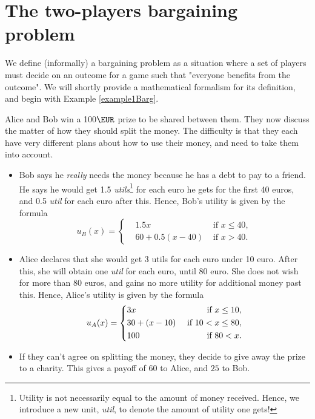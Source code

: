 \section{The two-players bargaining problem}
\label{sec2PBarg}


We define (informally) a bargaining problem as a situation where a set of players must decide on an outcome for a game such that "everyone benefits from the outcome". We will shortly provide a mathematical formalism for its definition, and begin with Example \ref{example1Barg}.

\begin{example}
\label{example1Barg}
Alice and Bob win a 100$\EUR$ prize to be shared between them.
They now discuss the matter of how they should split the money. The difficulty is that they each have very different plans about how to use their money, and need to take them into account.
\begin{itemize}
\item Bob says he \emph{really} needs the money because he has a debt to pay to a friend.
He says he would get 1.5 \emph{utils}\footnote{Utility is not necessarily equal to the amount of money received. Hence, we introduce a new unit, \emph{util}, to denote the amount of utility one gets!} for each euro he gets for the first 40 euros, and 0.5 \emph{util} for each euro after this.
Hence, Bob's utility is given by the formula
$$u_B(x) = \left \{ \begin{aligned}
& 1.5x & \text{ if $x \leq 40$}, \\
& 60 + 0.5(x - 40) & \text{ if $x > 40$}.
\end{aligned} \right . $$
\item Alice declares that she would get 3 utils for each euro under 10 euro.
After this, she will obtain one \emph{util} for each euro, until 80 euro. She does not wish for more than 80 euros, and gains no more utility for additional money past this.
Hence, Alice's utility is given by the formula
$$u_A(x) = \left \{ \begin{aligned}
& 3x & \text{ if $x \leq 10$}, \\
& 30 + (x - 10) & \text{ if $ 10 < x \leq 80$}, \\
& 100  & \text{ if $80 < x $}.
\end{aligned} \right . $$
\item If they can't agree on splitting the money, they decide to give away the prize to a charity. This gives a payoff of $60$ to Alice, and $25$ to Bob.
\end{itemize}


\end{example}
